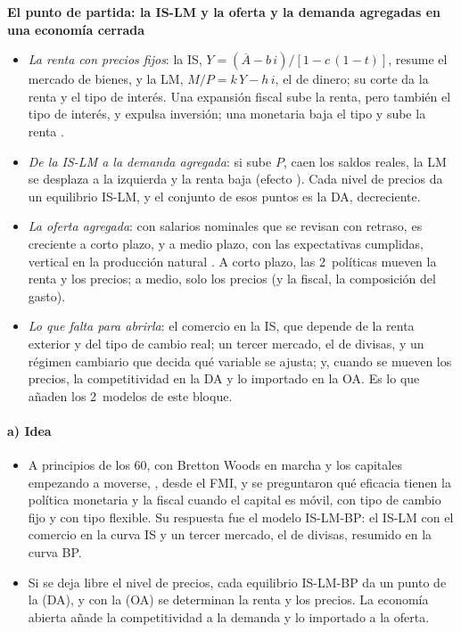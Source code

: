 \documentclass[11pt]{article}
\begin{document}
\begin{anotaciones}
\textbf{El punto de partida: la IS-LM y la oferta y la demanda agregadas en una economía cerrada}
\begin{itemize}
\item \emph{La renta con precios fijos}: la IS, $Y=(\overline{A}-b\,i)/[1-c\,(1-t)]$, resume el mercado de bienes, y la LM, $M/P=k\,Y-h\,i$, el de dinero; su corte da la renta y el tipo de interés. Una expansión fiscal sube la renta, pero también el tipo de interés, y expulsa inversión; una monetaria baja el tipo y sube la renta .
\item \emph{De la IS-LM a la demanda agregada}: si sube $P$, caen los saldos reales, la LM se desplaza a la izquierda y la renta baja (efecto ). Cada nivel de precios da un equilibrio IS-LM, y el conjunto de esos puntos es la DA, decreciente.
\item \emph{La oferta agregada}: con salarios nominales que se revisan con retraso, es creciente a corto plazo, y a medio plazo, con las expectativas cumplidas, vertical en la producción natural . A corto plazo, las 2~políticas mueven la renta y los precios; a medio, solo los precios (y la fiscal, la composición del gasto).
\item \emph{Lo que falta para abrirla}: el comercio en la IS, que depende de la renta exterior y del tipo de cambio real; un tercer mercado, el de divisas, y un régimen cambiario que decida qué variable se ajusta; y, cuando se mueven los precios, la competitividad en la DA y lo importado en la OA. Es lo que añaden los 2~modelos de este bloque.
\end{itemize}
\end{anotaciones}

\paragraph{a) Idea}

\begin{itemize}
\item A principios de los 60, con Bretton Woods en marcha y los capitales empezando a moverse, \textcite{Fleming1962Domestic}, desde el FMI, y \textcite{Mundell1963Capital} se preguntaron qué eficacia tienen la política monetaria y la fiscal cuando el capital es móvil, con tipo de cambio fijo y con tipo flexible. Su respuesta fue el modelo IS-LM-BP: el IS-LM  con el comercio en la curva IS y un tercer mercado, el de divisas, resumido en la curva BP.
\item Si se deja libre el nivel de precios, cada equilibrio IS-LM-BP da un punto de la  (DA), y con la  (OA) se determinan la renta y los precios. La economía abierta añade la competitividad a la demanda y lo importado a la oferta.
\end{itemize}
\end{document}
